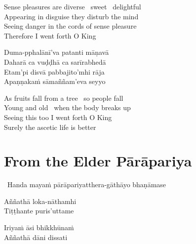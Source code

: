 \begin{english-verses}
  Sense pleasures are diverse \breathmark\ sweet \breathmark\ delightful\\
  Appearing in disguise they disturb the mind\\
  Seeing danger in the cords of sense pleasure\\
  Therefore I went forth O King
\end{english-verses}

\ifafive\clearpage\fi

\begin{verses}
  Duma-pphalānī'va patanti māṇavā\\
  Daharā ca vuḍḍhā ca sarīrabhedā\\
  Etam'pi disvā pabbajito'mhi rāja\\
  Apaṇṇakaṁ sāmaññam'eva seyyo
\end{verses}

\begin{english-verses}
  As fruits fall from a tree \breathmark\ so people fall\\
  Young and old \breathmark\ when the body breaks up\\
  Seeing this too I went forth O King\\
  Surely the ascetic life is better
\end{english-verses}

\suttaRef{[Thag 16.4 / MN 82]}

\ifdigital{}\fi



\section{From the Elder Pārāpariya}
\label{parapariya}

\begin{leader}
  \anglebracketleft\ \hspace{-0.5mm}Handa mayaṁ pārāpariyatthera-gāthāyo bhaṇāmase \hspace{-0.5mm}\anglebracketright\
\end{leader}

\ifninebythirteen

\begin{pali-hang-verses}
  Aññathā loka-nāthamhi\\
  Tiṭṭhante puris'uttame
\end{pali-hang-verses}
\begin{pali-hang-together}
  Iriyaṁ āsi bhikkhūnaṁ\\
  Aññathā dāni dissati
\end{pali-hang-together}

